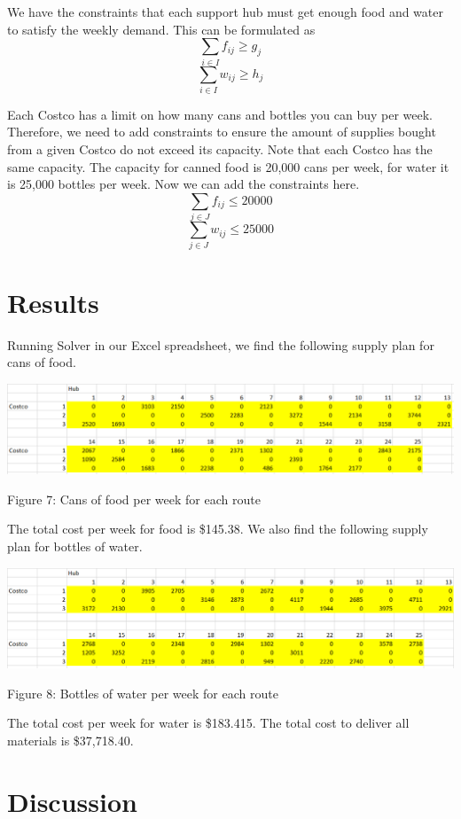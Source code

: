 \documentclass{article}
\begin{document}
We have the constraints that each support hub must get enough food and water to satisfy the weekly demand. This can be formulated as
\[\sum_{i\in I} f_{ij} \ge g_j\]
\[\sum_{i\in I} w_{ij} \ge h_j\]

Each Costco has a limit on how many cans and bottles you can buy per week. Therefore, we need to add constraints to ensure the amount of supplies bought from a given Costco do not exceed its capacity. Note that each Costco has the same capacity. The capacity for canned food is 20,000 cans per week, for water it is 25,000 bottles per week.
Now we can add the constraints here.
\[\sum_{j\in J} f_{ij}  \le 20000\]
\[\sum_{j\in J} w_{ij} \le 25000\]

\section{Results}

Running Solver in our Excel spreadsheet, we find the following supply plan for cans of food.

\begin{center}
    \includegraphics[scale=0.6]{food_plan_per_week_74_weeks.png}
    \caption{Figure 7: Cans of food per week for each route}
\end{center}

The total cost per week for food is \$145.38. We also find the following supply plan for bottles of water.

\begin{center}
    \includegraphics[scale=0.6]{water_plan_per_week_147_weeks.png}
    \caption{Figure 8: Bottles of water per week for each route}
\end{center}

The total cost per week for water is \$183.415. The total cost to deliver all materials is \$37,718.40.

\section{Discussion}
\end{document}
